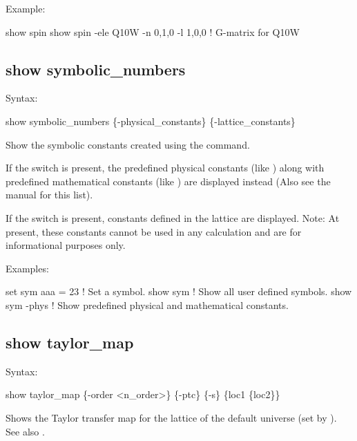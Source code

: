 {{{{{{{{{Example:
\begin{example}
  show spin
  show spin -ele Q10W -n 0,1,0 -l 1,0,0  ! G-matrix for Q10W
\end{example}


\subsection{show symbolic_numbers}
\label{s:show.symbolic}

Syntax:
\begin{example}
  show symbolic_numbers \{-physical_constants\} \{-lattice_constants\}
\end{example}

Show the symbolic constants created using the  command. 

If the  switch is present, the predefined physical constants (like
) along with predefined mathematical constants (like ) are displayed instead
(Also see the \bmad manual for this list).

If the  switch is present, constants defined in the lattice are displayed.
Note: At present, these constants cannot be used in any calculation and are for informational
purposes only.

Examples:
\begin{example}
  set sym aaa = 23  ! Set a symbol.
  show sym          ! Show all user defined symbols.
  show sym -phys    ! Show predefined physical and mathematical constants.
\end{example}


\subsection{show taylor_map}
\label{s:show.taylor}

Syntax:
\begin{example}
  show taylor_map \{-order <n_order>\} \{-ptc\} \{-s\} \{loc1 \{loc2\}\}
\end{example}

Shows the Taylor transfer map for the  lattice of the default universe (set by
).  See also .

}}}}}}}}}
